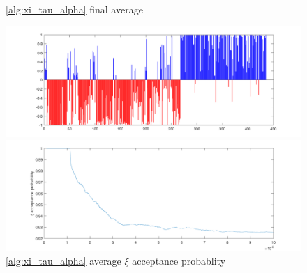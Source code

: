 \documentclass{siamart1116}
\begin{document}
    \begin{figure}[!htb]
    \begin{minipage}{0.48\textwidth}
        \caption{\label{fig:noncentered_voting_avg}\cref{alg:xi_tau_alpha} final average}
        \includegraphics[width=\linewidth]{voting/noncentered/final_avg.png}
    \end{minipage}\hfill
    \begin{minipage}{0.48\textwidth}
        \caption{\label{fig:noncentered_voting_accept} \cref{alg:xi_tau_alpha} average $\xi$ acceptance probablity}
        \includegraphics[width=\linewidth]{voting/noncentered/acceptance_xi_probability.png}
    \end{minipage}
    \end{figure}
\end{document}
